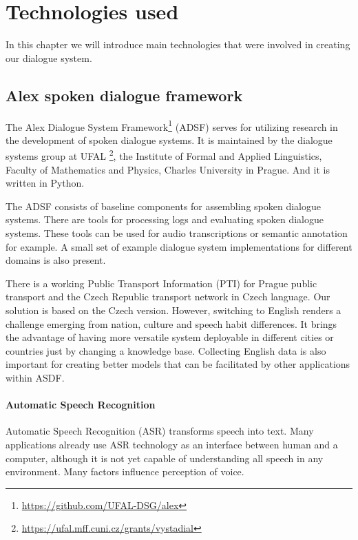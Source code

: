 \chapter{Technologies used}

In this chapter we will introduce main technologies that were involved in creating our dialogue system.

\section{Alex spoken dialogue framework}

The Alex Dialogue System Framework\footnote{\url{https://github.com/UFAL-DSG/alex}} (ADSF) serves for utilizing research in the development of spoken dialogue systems.
It is maintained by the dialogue systems group at UFAL \footnote{\url{https://ufal.mff.cuni.cz/grants/vystadial}}, the Institute of Formal and Applied Linguistics, Faculty of Mathematics and Physics, Charles University in Prague.
And it is written in Python.

The ADSF consists of baseline components for assembling spoken dialogue systems.
There are tools for processing logs and evaluating spoken dialogue systems.
These tools can be used for audio transcriptions or semantic annotation for example.
A small set of example dialogue system implementations for different domains is also present.

There is a working Public Transport Information (PTI) \cite{ptics} for Prague public transport and the Czech Republic transport network in Czech language.
Our solution is based on the Czech version.
However, switching to English renders a challenge emerging from nation, culture and speech habit differences.
It brings the advantage of having more versatile system deployable in different cities or countries just by changing a knowledge base.
Collecting English data is also important for creating better models that can be facilitated by other applications within ASDF.


\subsubsection{Automatic Speech Recognition}

Automatic Speech Recognition (ASR) transforms speech into text.
Many applications already use ASR technology as an interface between human and a computer, although it is not yet capable of understanding all speech in any environment.
Many factors influence perception of voice.

